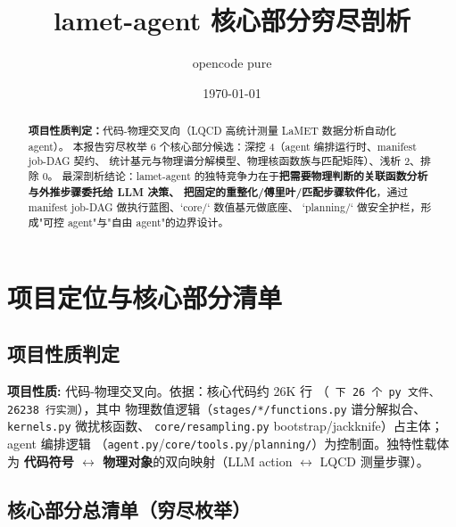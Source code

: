 \documentclass[UTF8]{ctexart}
\title{lamet-agent 核心部分穷尽剖析}
\author{opencode pure}
\date{\today}
\begin{document}
\maketitle

\begin{abstract}
\textbf{项目性质判定：}代码-物理交叉向（LQCD 高统计测量 LaMET 数据分析自动化 agent）。
本报告穷尽枚举 6 个核心部分候选：深挖 4（agent 编排运行时、manifest job-DAG 契约、
统计基元与物理谱分解模型、物理核函数族与匹配矩阵）、浅析 2、排除 0。
最深剖析结论：lamet-agent 的独特竞争力在于\textbf{把需要物理判断的关联函数分析与外推步骤委托给 LLM 决策、
把固定的重整化/傅里叶/匹配步骤软件化}，通过 manifest job-DAG 做执行蓝图、`core/` 数值基元做底座、
`planning/` 做安全护栏，形成"可控 agent"与"自由 agent"的边界设计。
\end{abstract}

\tableofcontents

\section{项目定位与核心部分清单}

\subsection{项目性质判定}

\begin{keybox}
\textbf{项目性质:} \textcolor{phys}{代码-物理交叉向}。依据：核心代码约 26K 行
（\texttt{ 下 26 个 py 文件、26238 行实测}），其中
物理数值逻辑（\texttt{stages/*/functions.py} 谱分解拟合、\texttt{kernels.py} 微扰核函数、
\texttt{core/resampling.py} bootstrap/jackknife）占主体；agent 编排逻辑
（\texttt{agent.py}/\texttt{core/tools.py}/\texttt{planning/}）为控制面。独特性载体为
\textbf{代码符号 $\leftrightarrow$ 物理对象}的双向映射（LLM action $\leftrightarrow$ LQCD 测量步骤）。
\end{keybox}

\subsection{核心部分总清单（穷尽枚举）}
\end{document}
